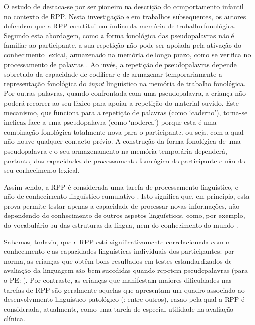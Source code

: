 \documentclass[output=paper,colorlinks,citecolor=brown,booklanguage=portuguese]{langscibook}
\begin{document}
O estudo de \citet{Gathercole1990} destaca-se por ser pioneiro na descrição do comportamento infantil no contexto de RPP. Nesta investigação e em trabalhos subsequentes, os autores defendem que a RPP constitui um índice da memória de trabalho fonológica. Segundo esta abordagem, como a forma fonológica das pseudopalavras não é familiar ao participante, a sua repetição não pode ser apoiada pela ativação do conhecimento lexical, armazenado na memória de longo prazo, como se verifica no processamento de palavras \citep{Gathercole1991, Gathercole1994}. Ao invés, a repetição de pseudopalavras depende sobretudo da capacidade de codificar e de armazenar temporariamente a representação fonológica do \emph{input} linguístico na memória de trabalho fonológica. Por outras palavras, quando confrontada com uma pseudopalavra, a criança não poderá recorrer ao seu léxico para apoiar a repetição do material ouvido. Este mecanismo, que funciona para a repetição de palavras (como ‘caderno’), torna-se ineficaz face a uma pseudopalavra (como ‘noderca’) porque esta é uma combinação fonológica totalmente nova para o participante, ou seja, com a qual não houve qualquer contacto prévio. A construção da forma fonológica de uma pseudopalavra e o seu armazenamento na memória temporária dependerá, portanto, das capacidades de processamento fonológico do participante e não do seu co\-nhecimento lexical.

Assim sendo, a RPP é considerada uma tarefa de processamento linguístico, e não de conhecimento linguístico cumulativo \citep{Campbell1997}. Isto significa que, em princípio, esta prova permite testar apenas a capacidade de processar novas informações, não dependendo do conhecimento de outros aspetos linguísticos, como, por exemplo, do vocabulário ou das estruturas da língua, nem do conhecimento do mundo \citep{Archibald2008}.

Sabemos, todavia, que a RPP está significativamente correlacionada com o conhecimento e as capacidades linguísticas individuais dos participantes: por norma, as crianças que obtêm bons resultados em testes estandardizados de avaliação da linguagem são bem-sucedidas quando repetem pseudopalavras (para o PE: \citealp{CruzSantos2009, Ribeiro2011}). Por contraste, as crianças que manifestam maiores dificuldades nas tarefas de RPP são geralmente aquelas que apresentam um quadro associado ao desenvolvimento linguístico patológico (\citealp{Bishop1996, ContiRamsdem2001, Weismer2000, Gathercole1994}; entre outros), razão pela qual a RPP é considerada, atualmente, como uma tarefa de especial utilidade na avaliação clínica.
\end{document}
